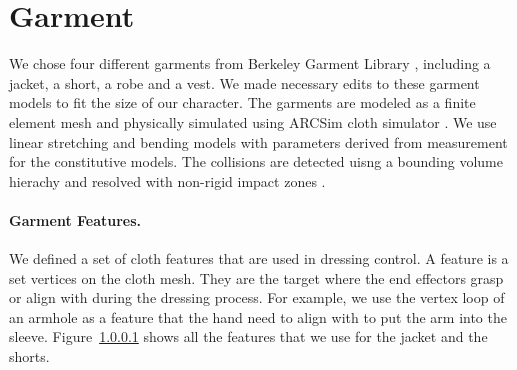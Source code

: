 \section{Garment}

We chose four different garments from Berkeley Garment Library \cite{}, including a jacket, a short, a robe and a vest. We made necessary edits to these garment models to fit the size of our character.
The garments are modeled as a finite element mesh and physically simulated using ARCSim cloth simulator \cite{}. We use linear stretching and bending models with parameters derived from measurement \cite{}  for the constitutive models. The collisions are detected uisng a bounding volume hierachy \cite{} and resolved with non-rigid impact zones \cite{}.

\paragraph{Garment Features.} We defined a set of cloth features that are used in dressing control. A feature is a set vertices on the cloth mesh. They are the target where the end effectors grasp or align with during the dressing process. For example, we use the vertex loop of an armhole as a feature that the hand need to align with to put the arm into the sleeve. Figure~\ref{} shows all the features that we use for the jacket and the shorts.
